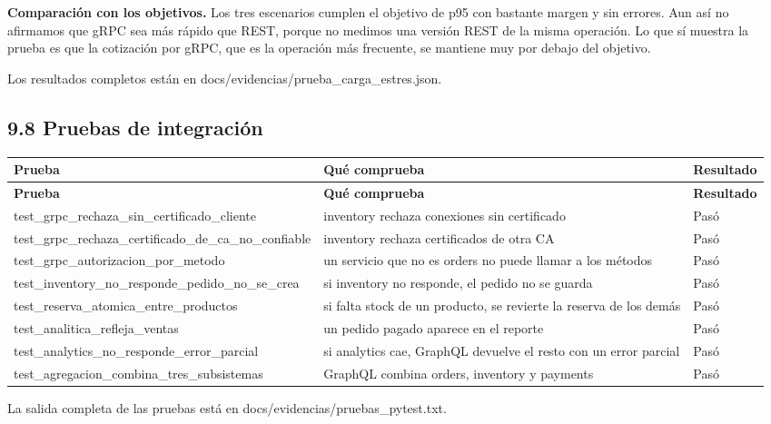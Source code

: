 \documentclass[10pt,letterpaper]{article}
\begin{document}
\textbf{Comparación con los objetivos.} Los tres escenarios cumplen el objetivo de p95 con bastante margen y sin errores. Aun así no afirmamos que gRPC sea más rápido que REST, porque no medimos una versión REST de la misma operación. Lo que sí muestra la prueba es que la cotización por gRPC, que es la operación más frecuente, se mantiene muy por debajo del objetivo.

Los resultados completos están en docs/\allowbreak{}evidencias/\allowbreak{}prueba\_\allowbreak{}carga\_\allowbreak{}estres.\allowbreak{}json.


\subsection*{9.8 Pruebas de integración}
{\footnotesize
\begin{longtable}{|P{\tabcolsep\relax}|P{\tabcolsep\relax}|P{\tabcolsep\relax}|}
\hline
\textbf{Prueba} & \textbf{Qué comprueba} & \textbf{Resultado} \\ \hline
\endfirsthead
\hline
\textbf{Prueba} & \textbf{Qué comprueba} & \textbf{Resultado} \\ \hline
\endhead
test\_\allowbreak{}grpc\_\allowbreak{}rechaza\_\allowbreak{}sin\_\allowbreak{}certificado\_\allowbreak{}cliente & inventory rechaza conexiones sin certificado & Pasó \\ \hline
test\_\allowbreak{}grpc\_\allowbreak{}rechaza\_\allowbreak{}certificado\_\allowbreak{}de\_\allowbreak{}ca\_\allowbreak{}no\_\allowbreak{}confiable & inventory rechaza certificados de otra CA & Pasó \\ \hline
test\_\allowbreak{}grpc\_\allowbreak{}autorizacion\_\allowbreak{}por\_\allowbreak{}metodo & un servicio que no es orders no puede llamar a los métodos & Pasó \\ \hline
test\_\allowbreak{}inventory\_\allowbreak{}no\_\allowbreak{}responde\_\allowbreak{}pedido\_\allowbreak{}no\_\allowbreak{}se\_\allowbreak{}crea & si inventory no responde, el pedido no se guarda & Pasó \\ \hline
test\_\allowbreak{}reserva\_\allowbreak{}atomica\_\allowbreak{}entre\_\allowbreak{}productos & si falta stock de un producto, se revierte la reserva de los demás & Pasó \\ \hline
test\_\allowbreak{}analitica\_\allowbreak{}refleja\_\allowbreak{}ventas & un pedido pagado aparece en el reporte & Pasó \\ \hline
test\_\allowbreak{}analytics\_\allowbreak{}no\_\allowbreak{}responde\_\allowbreak{}error\_\allowbreak{}parcial & si analytics cae, GraphQL devuelve el resto con un error parcial & Pasó \\ \hline
test\_\allowbreak{}agregacion\_\allowbreak{}combina\_\allowbreak{}tres\_\allowbreak{}subsistemas & GraphQL combina orders, inventory y payments & Pasó \\ \hline
\end{longtable}}
La salida completa de las pruebas está en docs/\allowbreak{}evidencias/\allowbreak{}pruebas\_\allowbreak{}pytest.\allowbreak{}txt.
\end{document}
